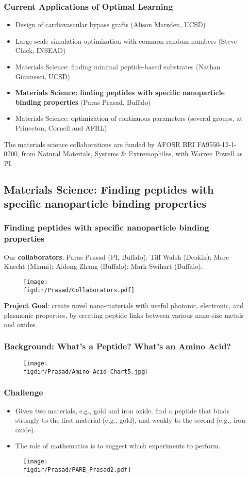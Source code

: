 \documentclass[13pt]{beamer}
\newcommand{\figdir}{../../fig}
\begin{document}
\begin{frame}\frametitle{Current Applications of Optimal Learning}
  \begin{itemize}
    \item Design of cardiovascular bypass grafts (Alison Marsden, UCSD)
    \item Large-scale simulation optimization with common random numbers (Steve Chick, INSEAD)
    \item Materials Science: finding minimal peptide-based substrates (Nathan Giannesci, UCSD)
    \item {\bf Materials Science: finding peptides with specific nanoparticle binding properties} (Paras Prasad, Buffalo)
    \item Materials Science: optimization of continuous parameters (several groups, at Princeton, Cornell and AFRL)
  \end{itemize}
  The materials science collaborations are funded by AFOSR BRI FA9550-12-1-0200, from Natural Materials, Systems \& Extremophiles, with Warren Powell as PI.
\end{frame}

\subsection{Materials Science: Finding peptides with specific nanoparticle binding properties}

\begin{frame}\frametitle{Finding peptides with specific nanoparticle binding properties}
  Our {\bf collaborators}: Paras Prasad (PI, Buffalo); Tiff Walsh (Deakin); Marc Knecht (Miami); Aidong Zhang (Buffalo); Mark Swihart (Buffalo).
  \begin{figure}\texttt{[image: \\figdir/Prasad/Collaborators.pdf]}\end{figure}
  {\bf Project Goal}: create novel nano-materials with useful photonic, electronic, and plasmonic properties, by creating peptide links between various nano-size metals and oxides.
\end{frame}

\begin{frame}\frametitle{Background: What's a Peptide?  What's an Amino Acid?} 
\begin{figure}\texttt{[image: \\figdir/Prasad/Amino-Acid-Chart5.jpg]}\end{figure}
\end{frame}

\begin{frame}\frametitle{Challenge}
  \begin{itemize}
    \item Given two materials, e.g., gold and iron oxide, find a
      peptide that binds strongly to the first material (e.g., gold), and
      weakly to the second (e.g., iron oxide).
    \item The role of mathematics is to suggest which experiments to perform. 
  \end{itemize}
  \begin{figure}\texttt{[image: \\figdir/Prasad/PARE\_Prasad2.pdf]}\end{figure}
\end{frame}
\end{document}
